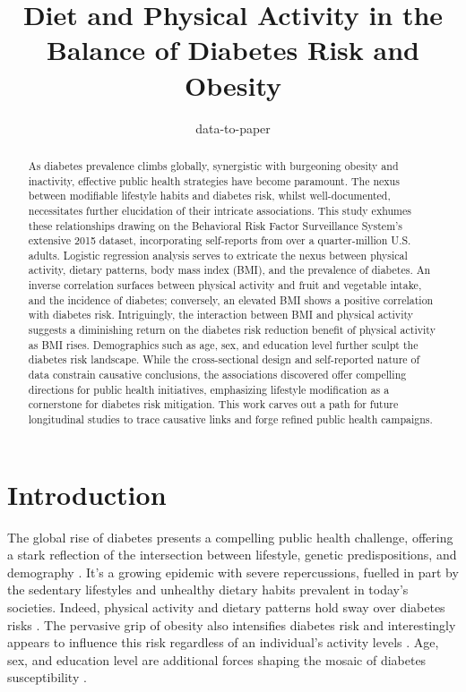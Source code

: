 \documentclass[11pt]{article}
\title{Diet and Physical Activity in the Balance of Diabetes Risk and Obesity}
\author{data-to-paper}
\begin{document}
\maketitle
\begin{abstract}
As diabetes prevalence climbs globally, synergistic with burgeoning obesity and inactivity, effective public health strategies have become paramount. The nexus between modifiable lifestyle habits and diabetes risk, whilst well-documented, necessitates further elucidation of their intricate associations. This study exhumes these relationships drawing on the Behavioral Risk Factor Surveillance System's extensive 2015 dataset, incorporating self-reports from over a quarter-million U.S. adults. Logistic regression analysis serves to extricate the nexus between physical activity, dietary patterns, body mass index (BMI), and the prevalence of diabetes. An inverse correlation surfaces between physical activity and fruit and vegetable intake, and the incidence of diabetes; conversely, an elevated BMI shows a positive correlation with diabetes risk. Intriguingly, the interaction between BMI and physical activity suggests a diminishing return on the diabetes risk reduction benefit of physical activity as BMI rises. Demographics such as age, sex, and education level further sculpt the diabetes risk landscape. While the cross-sectional design and self-reported nature of data constrain causative conclusions, the associations discovered offer compelling directions for public health initiatives, emphasizing lifestyle modification as a cornerstone for diabetes risk mitigation. This work carves out a path for future longitudinal studies to trace causative links and forge refined public health campaigns.
\end{abstract}
\section*{Introduction}

The global rise of diabetes presents a compelling public health challenge, offering a stark reflection of the intersection between lifestyle, genetic predispositions, and demography \cite{Bellou2018RiskFF}. It's a growing epidemic with severe repercussions, fuelled in part by the sedentary lifestyles and unhealthy dietary habits prevalent in today's societies. Indeed, physical activity and dietary patterns hold sway over diabetes risks \cite{Li2017TimeTO, Zhang2014AdherenceTH, Wing2011BenefitsOM}. The pervasive grip of obesity also intensifies diabetes risk and interestingly appears to influence this risk regardless of an individual’s activity levels \cite{Powell-Wiley2021ObesityAC, Chan1994ObesityFD}. Age, sex, and education level are additional forces shaping the mosaic of diabetes susceptibility \cite{Han2021AssociationOA}.
\end{document}
